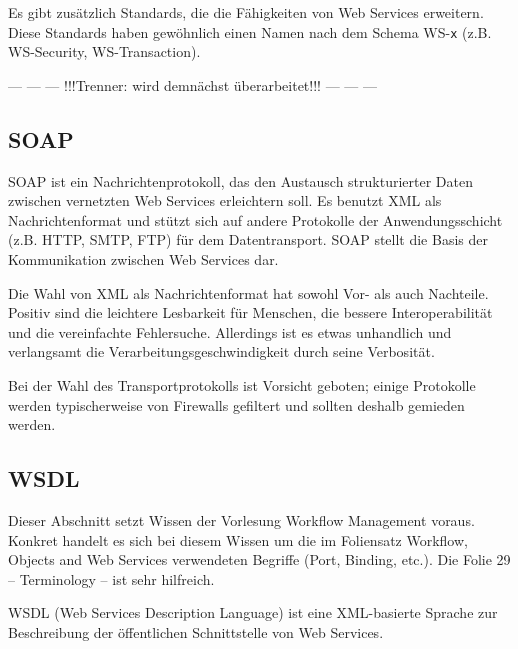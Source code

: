 \documentclass[runningheads]{llncs}
\newcommand{\germanquote}[1]{\glqq{}#1\grqq{}}
\begin{document}
    Es gibt zusätzlich Standards, die die Fähigkeiten von Web Services erweitern. Diese Standards haben gewöhnlich einen Namen nach dem Schema \germanquote{WS-\texttt{x}} (z.B. WS-Security, WS-Transaction). %


   \begin{center}--- --- --- !!!Trenner: wird demnächst überarbeitet!!! --- --- ---\end{center}

  \label{soap}
  \subsection{SOAP}
  \nocite{wk_soap}
    SOAP ist ein Nachrichtenprotokoll, das den Austausch strukturierter Daten zwischen vernetzten Web Services erleichtern soll. Es benutzt XML als Nachrichtenformat und stützt sich auf andere Protokolle der Anwendungsschicht (z.B. HTTP, SMTP, FTP) für dem Datentransport. SOAP stellt die Basis der Kommunikation zwischen Web Services dar.

    Die Wahl von XML als Nachrichtenformat hat sowohl Vor- als auch Nachteile.
    Positiv sind die leichtere Lesbarkeit für Menschen, die bessere Interoperabilität und die vereinfachte Fehlersuche. Allerdings ist es etwas unhandlich und verlangsamt die Verarbeitungsgeschwindigkeit durch seine Verbosität.

    Bei der Wahl des Transportprotokolls ist Vorsicht geboten; einige Protokolle werden typischerweise von Firewalls gefiltert und sollten deshalb gemieden werden.

  \subsection{WSDL}
  \label{wsdl}
  \nocite{wk_wsdl}
    Dieser Abschnitt setzt Wissen der Vorlesung \germanquote{Workflow Management}\cite{wfm_site} voraus. Konkret handelt es sich bei diesem Wissen um die im Foliensatz \germanquote{Workflow, Objects and Web Services}\cite{wfm_ch7} verwendeten Begriffe (Port, Binding, etc.). Die Folie 29 -- Terminology -- ist sehr hilfreich.

    WSDL (Web Services Description Language) ist eine XML-basierte Sprache zur Beschreibung der öffentlichen Schnittstelle von Web Services.
\end{document}
